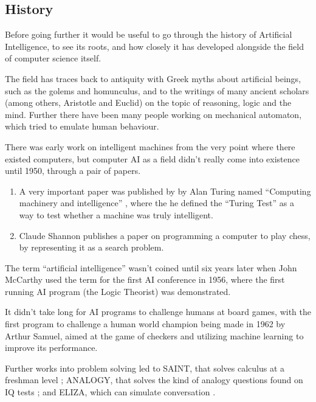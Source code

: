 \documentclass[]{report}
\begin{document}
\subsection{History}
\label{sec:trad-ai-history}

Before going further it would be useful to go through the history of Artificial
Intelligence, to see its roots, and how closely it has developed alongside the
field of computer science itself. \citep{luger2005artificial,buchanan2002brief}

The field has traces back to antiquity with Greek myths about artificial
beings, such as the golems and homunculus, and to the writings of many ancient
scholars (among others, Aristotle and Euclid) on the topic of reasoning, logic
and the mind. Further there have been many people working on mechanical
automaton, which tried to emulate human behaviour.

There was early work on intelligent machines from the very point where there
existed computers, but computer AI as a field didn't really come into existence
until 1950, through a pair of papers.

\begin{enumerate}
\item A very important paper was published by by Alan Turing named ``Computing
  machinery and intelligence'' \citep{turing1950computing}, where the he defined
  the ``Turing Test'' as a way to test whether a machine was truly intelligent.
\item Claude Shannon publishes a paper on programming a computer to play chess,
  by representing it as a search problem. \citep{shannon1950programming}
\end{enumerate}

The term ``artificial intelligence'' wasn't coined until six years later when
John McCarthy used the term for the first AI conference in 1956, where the first
running AI program (the Logic Theorist) was demonstrated.

It didn't take long for AI programs to challenge humans at board games, with the
first program to challenge a human world champion being made in 1962 by Arthur
Samuel, aimed at the game of checkers and utilizing machine learning to improve
its performance.

Further works into problem solving led to SAINT, that solves calculus at a
freshman level \citep{slagle1963heuristic}; ANALOGY, that solves the kind of
analogy questions found on IQ tests \citet{evans1964program}; and ELIZA, which
can simulate conversation \citep{weizenbaum1966eliza}.
\end{document}
